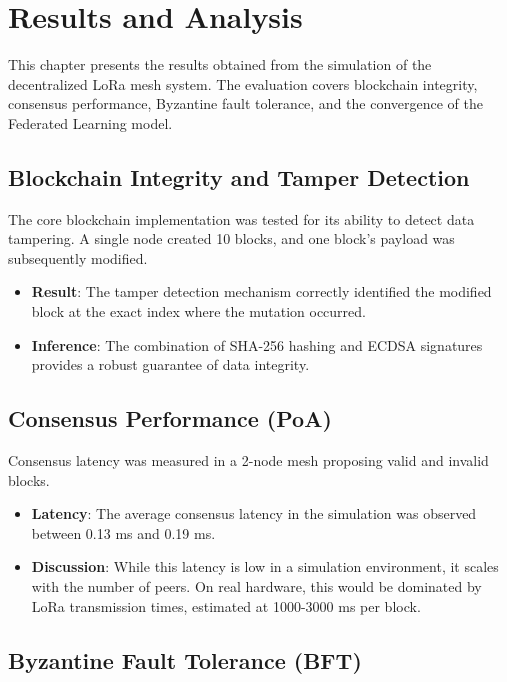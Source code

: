 \chapter{Results and Analysis}

This chapter presents the results obtained from the simulation of the decentralized LoRa mesh system. The evaluation covers blockchain integrity, consensus performance, Byzantine fault tolerance, and the convergence of the Federated Learning model.

\section{Blockchain Integrity and Tamper Detection}

The core blockchain implementation was tested for its ability to detect data tampering. A single node created 10 blocks, and one block's payload was subsequently modified.

\begin{itemize}
\item \textbf{Result}: The tamper detection mechanism correctly identified the modified block at the exact index where the mutation occurred.
\item \textbf{Inference}: The combination of SHA-256 hashing and ECDSA signatures provides a robust guarantee of data integrity.
\end{itemize}

\section{Consensus Performance (PoA)}

Consensus latency was measured in a 2-node mesh proposing valid and invalid blocks.

\begin{itemize}
\item \textbf{Latency}: The average consensus latency in the simulation was observed between 0.13 ms and 0.19 ms.
\item \textbf{Discussion}: While this latency is low in a simulation environment, it scales with the number of peers. On real hardware, this would be dominated by LoRa transmission times, estimated at 1000-3000 ms per block.
\end{itemize}

\section{Byzantine Fault Tolerance (BFT)}

